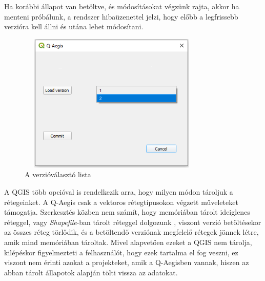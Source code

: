 Ha korábbi állapot van betöltve, és módosításokat végzünk rajta, akkor ha menteni próbálunk, a rendszer hibaüzenettel jelzi, hogy előbb a legfrissebb verzióra kell állni és utána lehet módosítani.
\begin{figure}[H]
	\centering
	\includegraphics[width=0.8\textwidth,height=250px]{images/available_versions.png}
	\caption{A verzióválasztó lista}
	\label{fig:picture-4}
\end{figure}

\begin{note}
A QGIS több opcióval is rendelkezik arra, hogy milyen módon tároljuk a rétegeinket. A Q-Aegis csak a vektoros rétegtípusokon végzett műveleteket támogatja. Szerkesztés közben nem számít, hogy memóriában tárolt ideiglenes réteggel, vagy \emph{Shapefile}-ban tárolt réteggel dolgozunk , viszont verzió betöltésekor az összes réteg törlődik, és a betöltendő verziónak megfelelő rétegek jönnek létre, amik mind memóriában tároltak. Mivel alapvetően ezeket a QGIS nem tárolja, kilépéskor figyelmezteti a felhasználót, hogy ezek tartalma el fog veszni, ez viszont nem érinti azokat a projekteket, amik a Q-Aegisben vannak, hiszen az abban tárolt állapotok alapján tölti vissza az adatokat. 
\end{note}

